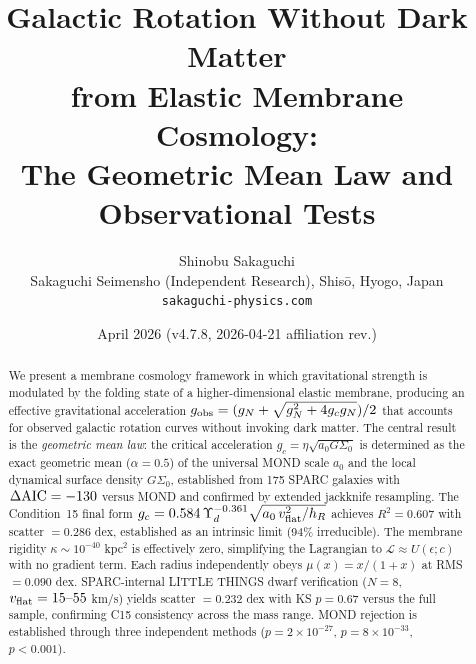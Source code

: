 \documentclass[11pt,a4paper]{article}
\title{\bfseries Galactic Rotation Without Dark Matter\\
from Elastic Membrane Cosmology:\\[4pt]
\large The Geometric Mean Law and Observational Tests}
\author{Shinobu Sakaguchi\\[2pt]
\small Sakaguchi Seimensho (Independent Research), Shis\={o}, Hyogo, Japan\\
\small \texttt{sakaguchi-physics.com}}
\date{April 2026 (v4.7.8, 2026-04-21 affiliation rev.)}
\newcommand{\gobs}{g_{\rm obs}}
\newcommand{\gN}{g_{N}}
\newcommand{\gc}{g_{c}}
\newcommand{\ao}{a_{0}}
\newcommand{\vflat}{v_{\rm flat}}
\newcommand{\hR}{h_{R}}
\newcommand{\Yd}{\Upsilon_{d}}
\newcommand{\kap}{\kappa}
\newcommand{\AIC}{\Delta{\rm AIC}}
\begin{document}
\maketitle
\thispagestyle{empty}

\begin{abstract}
\small\noindent
We present a membrane cosmology framework in which gravitational strength is modulated by the folding state
of a higher-dimensional elastic membrane, producing an effective gravitational acceleration
$\gobs = (\gN + \sqrt{\gN^2 + 4\gc\gN})/2$ that accounts for observed galactic rotation curves without invoking
dark matter. The central result is the \emph{geometric mean law}: the critical acceleration
$\gc = \eta\sqrt{\ao G \Sigma_0}$ is determined as the exact geometric mean ($\alpha=0.5$) of the universal
MOND scale $\ao$ and the local dynamical surface density $G\Sigma_0$, established from 175 SPARC galaxies with
$\AIC = -130$ versus MOND and confirmed by extended jackknife resampling. The Condition~15 final form
$\gc = 0.584\,\Yd^{-0.361}\sqrt{\ao\,\vflat^2/\hR}$ achieves $R^2 = 0.607$ with scatter $= 0.286$ dex,
established as an intrinsic limit (94\% irreducible). The membrane rigidity $\kap \sim 10^{-40}$ kpc$^2$ is
effectively zero, simplifying the Lagrangian to $\mathcal{L} \approx U(\epsilon; c)$ with no gradient term.
Each radius independently obeys $\mu(x) = x/(1+x)$ at RMS $= 0.090$ dex. SPARC-internal LITTLE THINGS dwarf
verification ($N=8$, $\vflat = 15\text{--}55$ km/s) yields scatter $= 0.232$ dex with KS $p=0.67$ versus the
full sample, confirming C15 consistency across the mass range. MOND rejection is established through three
independent methods ($p = 2 \times 10^{-27}$, $p = 8 \times 10^{-33}$, $p < 0.001$).


\end{abstract}
\end{document}
